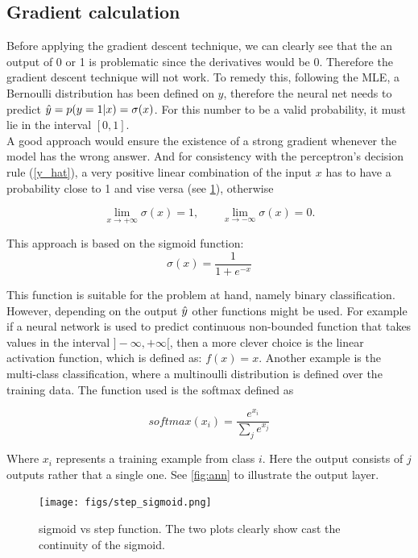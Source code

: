 \subsection{Gradient calculation}\label{sec:cal_gradient}

Before applying the gradient descent technique, we can clearly see that the an output of 0 or 1 is problematic since the derivatives would be 0. Therefore the gradient descent technique will not work. To remedy this, following the MLE, a Bernoulli distribution has been defined on $y$, therefore the neural net needs to predict $\hat{y} = p(y = 1 | x) = \sigma (x)$. For this number to be a valid probability, it must lie in the interval $[0, 1]$. \\
A good approach would ensure the existence of a strong gradient whenever the model has the wrong answer. And for consistency with the perceptron's decision rule (\cref{y_hat}), a very positive linear combination of the input $x$ has to have a probability close to 1 and vise versa (see \cref{fig:step_sigmoid}), otherwise

\begin{equation}
  \label{equ:limits}
  \lim_{x \rightarrow +\infty} \sigma(x) = 1, \qquad \lim_{x \rightarrow -\infty} \sigma(x) = 0.
\end{equation}

This approach is based on the sigmoid function:
 $$
 \sigma(x) = \frac{1}{1 + e^{-x}}
 $$

This function is suitable for the problem at hand, namely binary classification. However, depending on the output $\hat{y}$ other functions might be used. For example if a neural network is used to predict continuous non-bounded function that takes values in the interval $]-\infty, +\infty[$, then a more clever choice is the linear activation function, which is defined as: $f(x) = x$. Another example is the multi-class classification, where a multinoulli distribution is defined over the training data. The function used is the softmax defined as

$$
softmax(x_i) = \frac{e^{x_i}}{\sum_j e^{x_j}}
$$

Where $x_i$ represents a training example from class $i$. Here the output consists of $j$ outputs rather that a single one. See \cref{fig:ann} to illustrate the output layer.

\begin{figure}[!htpb]
  \centering
  \texttt{[image: figs/step\_sigmoid.png]}
  \caption[sigmoid vs step function]{sigmoid vs step function. The two plots clearly show cast the continuity of the sigmoid.}\label{fig:step_sigmoid}
\end{figure}

